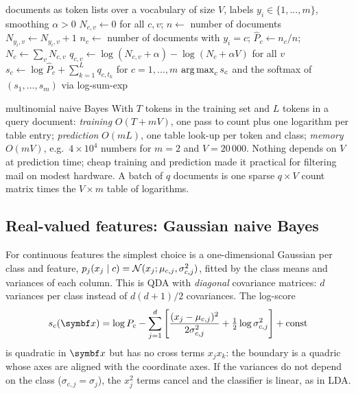 \documentclass[11pt]{article}
\begin{document}
\begin{algorithm}[H]
\caption{Multinomial naive Bayes for documents (bag of words)}\label{alg:mnb}
\footnotesize
\begin{algorithmic}[1]
\Require documents as token lists over a vocabulary of size $V$, labels $y_i \in \{1, \dots, m\}$, smoothing $\alpha > 0$
  \State $N_{c,v} \gets 0$ for all $c, v$; \quad $n \gets$ number of documents
    \State $N_{y_i, v} \gets N_{y_i, v} + 1$ 
  \EndFor
    \State $n_c \gets$ number of documents with $y_i = c$; \quad $\hat P_c \gets n_c/n$; \quad $N_c \gets \sum_v N_{c,v}$
    \State $q_{c,v} \gets \log(N_{c,v} + \alpha) - \log(N_c + \alpha V)$ for all $v$ 
  \EndFor
\EndFunction
{}
  \State $s_c \gets \log \hat P_c + \sum_{k=1}^{L} q_{c, t_k}$ for $c = 1, \dots, m$ 
  \State \Return $\operatorname*{arg\,max}_c s_c$ and the softmax of $(s_1, \dots, s_m)$ via log-sum-exp
\EndFunction
\end{algorithmic}
\end{algorithm}

\begin{runtime}{multinomial naive Bayes}
With $T$ tokens in the training set and $L$ tokens in a query document: \emph{training} $O(T + mV)$, one pass to count
plus one logarithm per table entry; \emph{prediction} $O(mL)$, one table look-up per token and class;
\emph{memory} $O(mV)$, e.g.\ $4 \times 10^4$ numbers for $m = 2$ and $V = 20\,000$. Nothing depends on $V$ at prediction
time; cheap training and prediction made it practical for filtering mail on modest hardware. A batch of $q$ documents
is one sparse $q \times V$ count matrix times the $V \times m$ table of logarithms.
\end{runtime}

\subsection{Real-valued features: Gaussian naive Bayes}\label{sec:gnb}

For continuous features the simplest choice is a one-dimensional Gaussian per class and feature,
$p_j(x_j \mid c) = \mathcal{N}(x_j; \mu_{c,j}, \sigma_{c,j}^2)$, fitted by the class means and variances of each column. This is
QDA with \emph{diagonal} covariance matrices: $d$ variances per class instead of $d(d+1)/2$ covariances. The log-score
\[
  s_c(\x) = \log P_c - \sum_{j=1}^d \left[\frac{(x_j - \mu_{c,j})^2}{2\sigma_{c,j}^2} + \tfrac12 \log \sigma_{c,j}^2\right]
  + \text{const}
\]
is quadratic in $\x$ but has no cross terms $x_j x_k$: the boundary is a quadric whose axes are aligned with the
coordinate axes. If the variances do not depend on the class ($\sigma_{c,j} = \sigma_j$), the $x_j^2$ terms cancel and
the classifier is linear, as in LDA.
\end{document}
